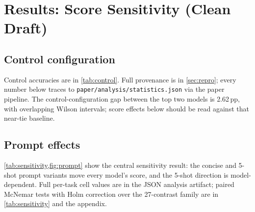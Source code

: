 \section{Results: Score Sensitivity (Clean Draft)}
\label{sec:results}

\subsection{Control configuration}
\label{sec:control}

Control accuracies are in \cref{tab:control}. Full provenance is in
\cref{sec:repro}; every number below traces to
\texttt{paper/analysis/statistics.json} via the paper pipeline. The
control-configuration gap between the top two models is 2.62\,pp, with
overlapping Wilson intervals; score effects below should be read against
that near-tie baseline.



\subsection{Prompt effects}
\label{sec:prompt}

\cref{tab:sensitivity,fig:prompt} show the central sensitivity result:
the concise and 5-shot prompt variants move every model's score, and
the 5-shot direction is model-dependent. Full per-task cell values are
in the JSON analysis artifact; paired McNemar tests with Holm
correction over the 27-contrast family are in \cref{tab:sensitivity}
and the appendix.
